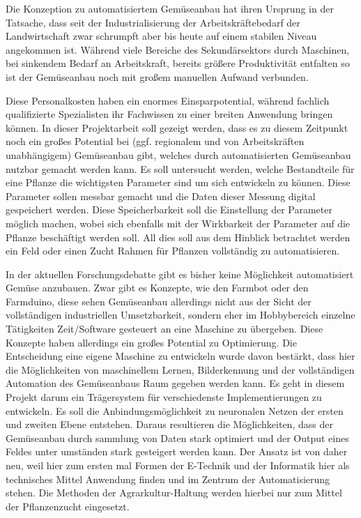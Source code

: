 \documentclass[]{article}
\begin{document}
Die Konzeption zu automatisiertem Gemüseanbau hat ihren Ursprung in der Tatsache, dass seit der Industrialisierung der Arbeitskräftebedarf der Landwirtschaft zwar schrumpft aber bis heute auf einem stabilen Niveau angekommen ist. Während viele Bereiche des Sekundärsektors durch Maschinen, bei sinkendem Bedarf an Arbeitskraft, bereits größere Produktivität entfalten so ist der Gemüseanbau noch mit großem manuellen Aufwand verbunden. 

Diese Personalkosten haben ein enormes Einsparpotential, während fachlich qualifizierte Spezialisten ihr Fachwissen zu einer breiten Anwendung bringen können.
In dieser Projektarbeit soll gezeigt werden, dass es zu diesem Zeitpunkt noch ein großes Potential bei (ggf. regionalem und von Arbeitskräften unabhängigem) Gemüseanbau gibt, welches durch automatisierten Gemüseanbau nutzbar gemacht werden kann. Es soll untersucht werden, welche Bestandteile für eine Pflanze die wichtigsten Parameter sind um sich entwickeln zu können. Diese Parameter sollen messbar gemacht und die Daten dieser Messung digital gespeichert werden. Diese Speicherbarkeit soll die Einstellung der Parameter möglich machen, wobei sich ebenfalls mit der Wirkbarkeit der Parameter auf die Pflanze beschäftigt werden soll. All dies soll aus dem Hinblick betrachtet werden ein Feld oder einen Zucht Rahmen für Pflanzen vollständig zu automatisieren.

In der aktuellen Forschungsdebatte gibt es bisher keine Möglichkeit automatisiert Gemüse anzubauen. Zwar gibt es Konzepte, wie den Farmbot oder den Farmduino, diese sehen Gemüseanbau allerdings nicht aus der Sicht der vollständigen industriellen Umsetzbarkeit, sondern eher im Hobbybereich einzelne Tätigkeiten Zeit/Software gesteuert an eine Maschine zu übergeben. Diese Konzepte haben allerdings ein großes Potential zu Optimierung. Die Entscheidung eine eigene Maschine zu entwickeln wurde davon bestärkt, dass hier die Möglichkeiten von maschinellem Lernen, Bilderkennung und der vollständigen Automation des Gemüseanbaus Raum gegeben werden kann. Es geht in diesem Projekt darum ein Trägersystem für verschiedenste Implementierungen zu entwickeln. Es soll die Anbindungsmöglichkeit zu neuronalen Netzen der ersten und zweiten Ebene entstehen. Daraus resultieren die Möglichkeiten, dass der Gemüseanbau durch sammlung von Daten stark optimiert und der Output eines Feldes unter umständen stark gesteigert werden kann. Der Ansatz ist von daher neu, weil hier zum ersten mal Formen der E-Technik und der Informatik hier als technisches Mittel Anwendung finden und im Zentrum der Automatisierung stehen. Die Methoden der Agrarkultur-Haltung werden hierbei nur zum Mittel der Pflanzenzucht eingesetzt. 
\end{document}
